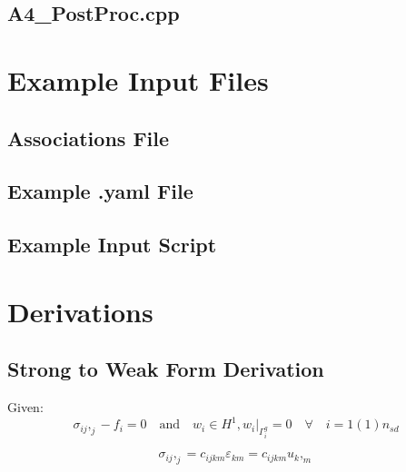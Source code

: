 \documentclass[a4paper, 12pt]{article}
\begin{document}
\subsection{A4\_PostProc.cpp} \label{subsec:PostProc.cpp}


\newpage
\section{Example Input Files}\label{sec:ExInput}

\subsection{Associations File} \label{subsec:ExAssoc}


\subsection{Example .yaml File} \label{subsec:ExYaml}


\subsection{Example Input Script} \label{subsec:ExIn}


\newpage
\section{Derivations} \label{sec:Derivations}

\subsection{Strong to Weak Form Derivation} \label{sec:WeakDer}

Given:
\begin{equation*}
\sigma_{ij},_{j} - f_{i} = 0 \quad \text{and} \quad
w_{i} \in H^1, w_{i}\Big|_{\Gamma^{g}_{i}} = 0
    \quad \forall \quad i=1(1)n_{sd}
\end{equation*}

\begin{equation*}
\sigma_{ij},_{j} = c_{ijkm} \varepsilon_{km} = c_{ijkm} u_{k},_{m}
\end{equation*}
\end{document}

